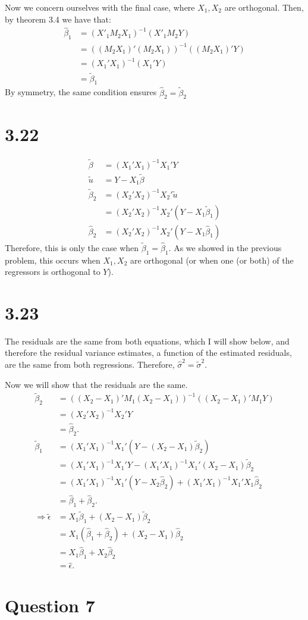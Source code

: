 \documentclass[11pt]{article} %
\begin{document}
Now we concern ourselves with the final case, where $X_1,X_2$ are orthogonal. Then, by theorem 3.4 we have that:
\begin{align*}
\hat{\beta}_1 &= (X'_1M_2X_1)^{-1}(X'_1 M_2 Y)\\
 &=  ((M_2X_1)'(M_2X_1))^{-1}((M_2X_1)' Y) \\
&= (X_1'X_1)^{-1}(X_1' Y)\\
&= \tilde{\beta}_1
\end{align*}
By symmetry, the same condition ensures $\hat{\beta}_2 =  \tilde{\beta}_2$
\section{3.22}
\begin{align*}
\tilde{\beta} &= (X_1'X_1)^{-1}X_1'Y\\
\tilde{u} &= Y -X_1\tilde{\beta}\\
\tilde{\beta}_2 &= (X_2'X_2)^{-1}X_2'\tilde{u}\\
&= (X_2'X_2)^{-1}X_2'(Y -X_1\tilde{\beta}_1)\\
\hat{\beta}_2 &= (X_2'X_2)^{-1}X_2'(Y -X_1\hat{\beta}_1)
\end{align*}
Therefore, this is only the case when $\tilde{\beta}_1=\hat{\beta}_1$. As we showed in the previous problem, this occurs when $X_1,X_2$ are orthogonal (or when one (or both) of the regressors is orthogonal to $Y$).
\section{3.23}
The residuals are the same from both equations, which I will show below, and therefore the residual variance estimates, a function of the estimated residuals, are the same from both regressions. Therefore, $\hat{\sigma}^2 = \tilde{\sigma}^2.$

Now we will show that the residuals are the same.
\begin{align*}
\tilde{\beta}_2 &= ((X_2-X_1)'M_1(X_2-X_1))^{-1} ((X_2 -X_1)'M_1Y)\\
&= (X_2'X_2)^{-1}X_2'Y \\
&= \hat{\beta}_2.\\
\tilde{\beta}_1 &= (X_1'X_1)^{-1}X_1' (Y-(X_2 - X_1)\tilde{\beta}_2) \\
&=  (X_1'X_1)^{-1}X_1'Y -  (X_1'X_1)^{-1}X_1' (X_2 - X_1)\tilde{\beta}_2\\
&= (X_1'X_1)^{-1}X_1'(Y - X_2\hat{\beta}_2) +  (X_1'X_1)^{-1}X_1'X_1\hat{\beta}_2\\
&= \hat{\beta}_1 + \hat{\beta}_2.\\
\Rightarrow \tilde{\epsilon} &= X_1\tilde{\beta}_1 + (X_2 - X_1)\tilde{\beta}_2\\
&= X_1(\hat{\beta}_1 + \hat{\beta}_2) +(X_2 - X_1)\hat{\beta}_2\\
&= X_1\hat{\beta}_1 + X_2 \hat{\beta}_2\\
&= \hat{\epsilon}.
\end{align*}

\section{Question 7}
\end{document}
